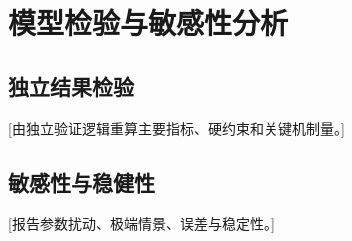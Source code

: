 \section{模型检验与敏感性分析}
\subsection{独立结果检验}
[由独立验证逻辑重算主要指标、硬约束和关键机制量。]
\subsection{敏感性与稳健性}
[报告参数扰动、极端情景、误差与稳定性。]
